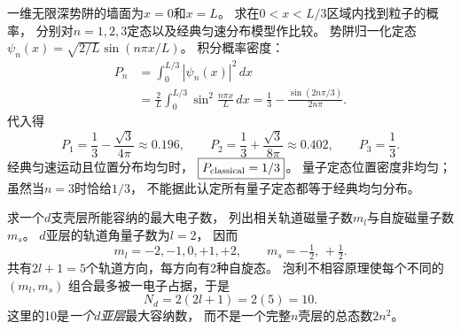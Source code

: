 \problemtext 一维无限深势阱的墙面为$x=0$和$x=L$。
求在$0<x<L/3$区域内找到粒子的概率，
分别对$n=1,2,3$定态以及经典匀速分布模型作比较。
\workings
势阱归一化定态
$\psi_n(x)=\sqrt{2/L}\sin(n\pi x/L)$。
积分概率密度：
\[
 \begin{aligned}
 P_n&=\int_0^{L/3}|\psi_n(x)|^2\,dx\\
 &=\frac{2}{L}\int_0^{L/3}
       \sin^2\frac{n\pi x}{L}\,dx
 =\boxed{\frac13-\frac{\sin(2n\pi/3)}{2n\pi}}.
 \end{aligned}
\]
代入得
\[
 \boxed{P_1=\frac13-\frac{\sqrt3}{4\pi}\approx0.196},
 \qquad
 \boxed{P_2=\frac13+\frac{\sqrt3}{8\pi}\approx0.402},
 \qquad
 \boxed{P_3=\frac13}.
\]
经典匀速运动且位置分布均匀时，
$\boxed{P_{\rm classical}=1/3}$。
\crosscheck 量子定态位置密度非均匀；
虽然当$n=3$时恰给$1/3$，
不能据此认定所有量子定态都等于经典均匀分布。

\problemtext 求一个$d$支壳层所能容纳的最大电子数，
列出相关轨道磁量子数$m_l$与自旋磁量子数$m_s$。
\workings
$d$亚层的轨道角量子数为$l=2$，
因而
\[
 \boxed{m_l=-2,-1,0,+1,+2},\qquad
 \boxed{m_s=-\tfrac12,\,+\tfrac12}.
\]
共有$2l+1=5$个轨道方向，每方向有2种自旋态。
泡利不相容原理使每个不同的$(m_l,m_s)$
组合最多被一电子占据，于是
\[
 \boxed{N_d=2(2l+1)=2(5)=10}.
\]
\crosscheck 这里的10是\emph{一个$d$亚层}最大容纳数，
而不是一个完整$n$壳层的总态数$2n^2$。
